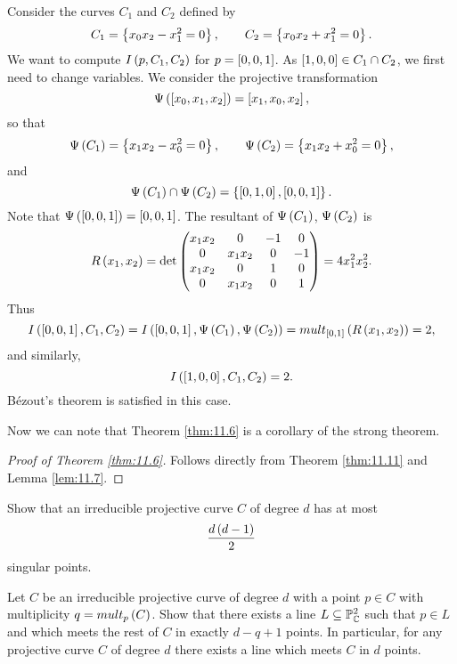 
\begin{example}
Consider the curves $ C_1 $ and $ C_2 $ defined by
$$ C_1 = \cb{x_0x_2 - x_1^2 = 0}, \qquad C_2 = \cb{x_0x_2 + x_1^2 = 0}. $$
We want to compute $ I\rb{p, C_1, C_2} $ for $ p = \sb{0, 0, 1} $. As $ \sb{1, 0, 0} \in C_1 \cap C_2 $, we first need to change variables. We consider the projective transformation
$$ \Psi\rb{\sb{x_0, x_1, x_2}} = \sb{x_1, x_0, x_2}, $$
so that
$$ \Psi\rb{C_1} = \cb{x_1x_2 - x_0^2 = 0}, \qquad \Psi\rb{C_2} = \cb{x_1x_2 + x_0^2 = 0}, $$
and
$$ \Psi\rb{C_1} \cap \Psi\rb{C_2} = \cb{\sb{0, 1, 0}, \sb{0, 0, 1}}. $$
Note that $ \Psi\rb{\sb{0, 0, 1}} = \sb{0, 0, 1} $. The resultant of $ \Psi\rb{C_1} $, $ \Psi\rb{C_2} $ is
$$ R\rb{x_1, x_2} = \det
\begin{pmatrix}
x_1x_2 & 0 & -1 & 0 \\
0 & x_1x_2 & 0 & -1 \\
x_1x_2 & 0 & 1 & 0 \\
0 & x_1x_2 & 0 & 1
\end{pmatrix}
= 4x_1^2x_2^2. $$
Thus
$$ I\rb{\sb{0, 0, 1}, C_1, C_2} = I\rb{\sb{0, 0, 1}, \Psi\rb{C_1}, \Psi\rb{C_2}} = mult_{\sb{0, 1}}\rb{R\rb{x_1, x_2}} = 2, $$
and similarly,
$$ I\rb{\sb{1, 0, 0}, C_1, C_2} = 2. $$
B\'ezout's theorem is satisfied in this case.
\end{example}

Now we can note that Theorem \ref{thm:11.6} is a corollary of the strong theorem.

\begin{proof}[Proof of Theorem \ref{thm:11.6}]
Follows directly from Theorem \ref{thm:11.11} and Lemma \ref{lem:11.7}.
\end{proof}

\begin{exercise}
Show that an irreducible projective curve $ C $ of degree $ d $ has at most
$$ \dfrac{d\rb{d - 1}}{2} $$
singular points.
\end{exercise}

\begin{exercise}
Let $ C $ be an irreducible projective curve of degree $ d $ with a point $ p \in C $ with multiplicity $ q = mult_p\rb{C} $. Show that there exists a line $ L \subseteq \P_\C^2 $ such that $ p \in L $ and which meets the rest of $ C $ in exactly $ d - q + 1 $ points. In particular, for any projective curve $ C $ of degree $ d $ there exists a line which meets $ C $ in $ d $ points.
\end{exercise}

